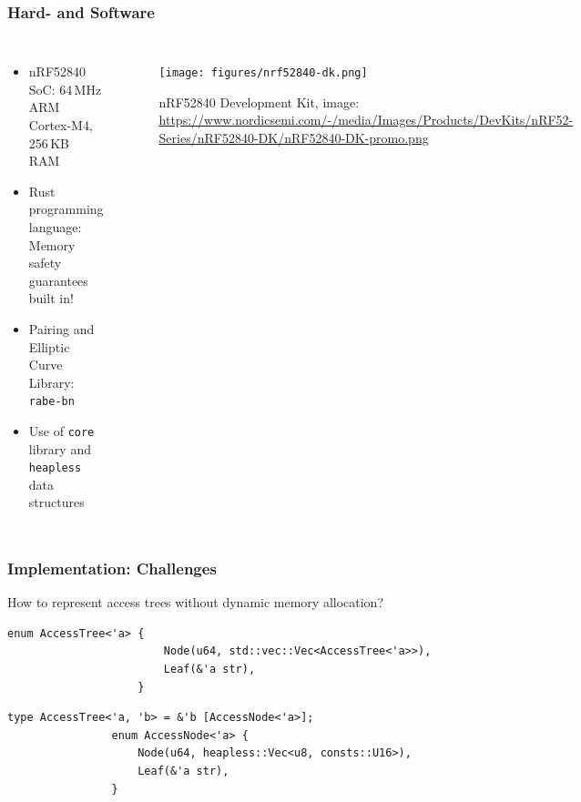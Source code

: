 \begin{frame}[c]
    \frametitle{Hard- and Software}
    \begin{columns}[c]
        \begin{itemize}
            \item nRF52840 SoC: \textcolor{TUMBlau}{64\,MHz} ARM Cortex-M4, \textcolor{TUMBlau}{256\,KB RAM}
            \item Rust programming language: Memory safety guarantees built in!
            \item Pairing and Elliptic Curve Library: \texttt{rabe-bn}\footnotemark
            \item Use of \texttt{core} library and \texttt{heapless} data structures\footnotemark
        \end{itemize}
        
        \begin{figure}
            \texttt{[image: figures/nrf52840-dk.png]}
            \caption{nRF52840 Development Kit, image: \url{https://www.nordicsemi.com/-/media/Images/Products/DevKits/nRF52-Series/nRF52840-DK/nRF52840-DK-promo.png}}
        \end{figure}
    \end{columns}
\end{frame}

\begin{frame}[c, fragile]
    \frametitle{Implementation: Challenges}
    \begin{block}{How to represent access trees without dynamic memory allocation?}
        \begin{center}
            \begin{minipage}{0.7\textwidth}
                \begin{lstlisting}[caption={Naive implementation (uses standard library)}]
                    enum AccessTree<'a> {
                        Node(u64, std::vec::Vec<AccessTree<'a>>),
                        Leaf(&'a str),
                    }
                \end{lstlisting}
            \begin{lstlisting}[caption={Refined implementation}]
                type AccessTree<'a, 'b> = &'b [AccessNode<'a>];
                enum AccessNode<'a> {
                    Node(u64, heapless::Vec<u8, consts::U16>),
                    Leaf(&'a str),
                }
                \end{lstlisting}
            \end{minipage}
        \end{center}
    \end{block}
\end{frame}

